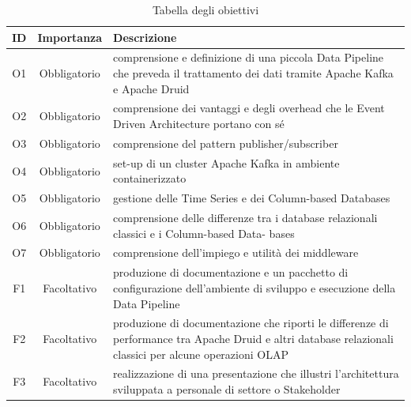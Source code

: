  \begin{table}[htbp]
    \centering
    \caption{Tabella degli obiettivi}    
    \label{tab:Tabella1}
    \begin{tabularx}{\textwidth}{|c|c|X|}
        \hline
        \textbf{ID} & \textbf{Importanza} & \textbf{Descrizione} \\\hline
        O1 & Obbligatorio & comprensione e definizione di una piccola \gls{Data Pipeline}{}  che  preveda il trattamento dei dati
        tramite Apache Kafka e Apache Druid \\\hline
        O2 & Obbligatorio & comprensione dei vantaggi e degli overhead  che le Event Driven Architecture portano con
        sé\\\hline
        O3 & Obbligatorio & comprensione del pattern publisher/subscriber \\\hline
        O4 & Obbligatorio & set-up di un cluster Apache Kafka in ambiente  containerizzato \\\hline
        O5 & Obbligatorio & gestione delle Time Series e dei Column-based Databases \\\hline
        O6 & Obbligatorio & comprensione delle differenze tra i database relazionali  classici e i Column-based Data-
        bases\\\hline
        O7 & Obbligatorio &comprensione dell’impiego e utilità dei middleware \\\hline
        F1 & Facoltativo & produzione di documentazione e un pacchetto di configurazione  dell’ambiente di sviluppo e
        esecuzione  della \gls{Data Pipeline}{}\\\hline
        F2 & Facoltativo & produzione di documentazione che riporti  le differenze  di performance  tra Apache Druid e altri
         database relazionali classici per alcune  operazioni OLAP \\\hline
        F3 & Facoltativo & realizzazione di una presentazione che illustri l’architettura  sviluppata  a personale di settore o
        Stakeholder \\\hline
    \end{tabularx} 

\end{table}

\pagebreak

\pagebreak
